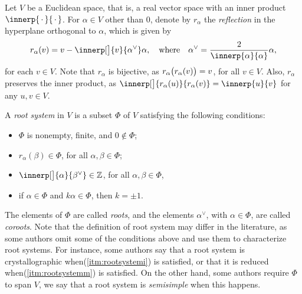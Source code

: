 \documentclass[a4paper,reqno]{amsart}
\numberwithin{equation}{section}
\theoremstyle{plain}
\theoremstyle{definition}
\theoremstyle{remark}
\newcommand*{\dtgterm}[1]{\emph{#1}}  %
\newcommand*{\avoidrefbreak}{\nolinebreak[3] }   %
\newcommand*{\itmform}[1]{\textup{(#1)}}
\newcommand*{\itmref}[1]{\itmform{\ref{#1}}}
\newcounter{cstlabeli}
\newcommand*{\cstlabel}[1]{%
  \renewcommand*{\thecstlabeli}{#1}%
  \refstepcounter{cstlabeli}%
}
\newcommand*{\itmcstlabel}[1]{%
  \cstlabel{#1}%
  \itmform{#1}%
}
\newcommand*{\cstitem}[2]{%
  \item[%
    \itmcstlabel{#1}%
    \label{#2}%
  ]%
}
\newcommand*{\Z}{\mathbb{Z}}               %
\DeclarePairedDelimiter{\parens}{\lparen}{\rparen}
\newcommand*{\alphav}{\alpha^{\vee}}
\newcommand*{\betav}{\beta^{\vee}}
\begin{document}

Let $V$ be a Euclidean space, that is, a real vector space with an inner product $\innerp{\,{\cdot}\,}{\,{\cdot}\,}$.
For $\alpha \in V$ other than $0$, denote by $r_{\alpha}$ the \dtgterm{reflection} in the hyperplane orthogonal to $\alpha$, which is given by
\[
r_{\alpha} (v) = v - \innerp[\big]{v}{\alphav} \alpha,
\quad \text{where} \quad
\alphav = \frac{2}{\innerp{\alpha}{\alpha}} \alpha,
\]
for each $v \in V$. Note that $r_\alpha$ is bijective, as $r_{\alpha} \parens[\big]{ r_{\alpha} (v) } = v$, for all $v \in V$. Also, $r_\alpha$ preserves the inner product, as $\innerp[\big]{r_\alpha (u)}{r_\alpha (v)} = \innerp{u}{v}$ for any $u, v \in V$.

A \dtgterm{root system} in $V$ is a subset $\Phi$ of $V$ satisfying the following conditions:
\begin{itemize}
\cstitem{RS1}{itm:rootsystemz}
$\Phi$ is nonempty, finite, and $0 \notin \Phi$;

\cstitem{RS2}{itm:rootsystemr}
$r_\alpha (\beta) \in \Phi$, for all $\alpha, \beta \in \Phi$;

\cstitem{RS3}{itm:rootsystemi}
$\innerp[\big]{\alpha}{\betav} \in \Z$, for all $\alpha, \beta \in \Phi$,

\cstitem{RS4}{itm:rootsystemm}
if $\alpha \in \Phi$ and $k \alpha \in \Phi$, then $k = \pm 1$.
\end{itemize}
The elements of $\Phi$ are called \dtgterm{roots}, and the elements $\alphav$, with $\alpha \in \Phi$, are called \dtgterm{coroots}.
Note that the definition of root system may differ in the literature, as some authors omit some of the conditions above and use them to characterize root systems. For instance, some authors say that a root system is crystallographic when\avoidrefbreak \itmref{itm:rootsystemi} is satisfied, or that it is reduced when\avoidrefbreak \itmref{itm:rootsystemm} is satisfied.
On the other hand, some authors require $\Phi$ to span $V$, we say that a root system is \dtgterm{semisimple} when this happens.
\end{document}
